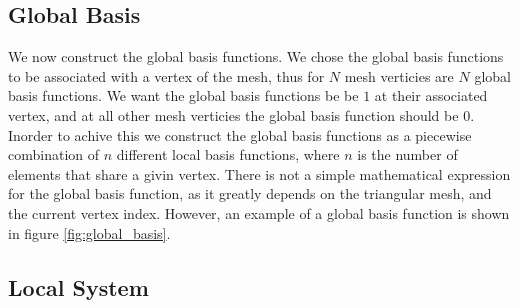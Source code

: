 \documentclass[../fem.tex]{subfiles}
\begin{document}
\subsection{Global Basis}%
\label{sub:global_basis}

We now construct the global basis functions. We chose the global basis
functions to be associated with a vertex of the mesh, thus for $N$ mesh
verticies are $N$ global basis functions. We want the global basis functions be
be $1$ at their associated vertex, and at all other mesh verticies the global
basis function should be $0$. Inorder to achive this we construct the global
basis functions as a piecewise combination of $n$ different local basis
functions, where $n$ is the number of elements that share a givin vertex. There
is not a simple mathematical expression for the global basis function, as it
greatly depends on the triangular mesh, and the current vertex index. However,
an example of a global basis function is shown in figure
\ref{fig:global_basis}.

\begin{Figure}
   \begin{center}
   \end{center}
   \label{fig:global_basis}
\end{Figure}

\subsection{Local System}%
\label{sub:local_system}
\end{document}
